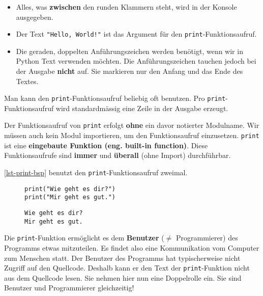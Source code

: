 \begin{itemize}
	\item Alles, was \textbf{zwischen} den runden Klammern steht, wird in der Konsole ausgegeben.
	\item Der Text \lstinline[showstringspaces=False]{"Hello, World!"} ist das Argument für den \lstinline{print}-Funktionsaufruf.
	\item Die geraden, doppelten Anführungszeichen werden benötigt, wenn wir in Python Text verwenden möchten. Die Anführungszeichen tauchen jedoch bei der Ausgabe \textbf{nicht} auf. Sie markieren nur den Anfang und das Ende des Textes.
\end{itemize}

Man kann den \lstinline{print}-Funktionsaufruf beliebig oft benutzen. Pro \lstinline{print}-Funktionsaufruf wird standardmässig eine Zeile in der Ausgabe erzeugt.

\begin{important}
Der Funktionsaufruf von \lstinline{print} erfolgt \textbf{ohne} ein davor notierter Modulname. Wir müssen auch kein Modul importieren, um den Funktionsaufruf einzusetzen. \lstinline{print} ist eine \textbf{eingebaute Funktion (eng. built-in function)}. Diese Funktionsaufrufe sind \textbf{immer} und \textbf{überall} (ohne Import) durchführbar. 
\end{important}

\begin{example}
\autoref{lst-print-bsp} benutzt den \lstinline{print}-Funktionsaufruf zweimal. 

\begin{figure}[htb]
\centering
	\begin{minipage}{0.5\textwidth}
	\centering
\begin{lstlisting}[caption={Quellcode aus \graybgtexttt{print\_bsp.py}.}, label=lst-print-bsp]
print("Wie geht es dir?")
print("Mir geht es gut.")
\end{lstlisting}
	\end{minipage}
	\hfill
	\begin{minipage}{0.4\textwidth}
	\centering
\begin{lstlisting}[caption={Ausgabe in der Konsole.}, language=output]
Wie geht es dir?
Mir geht es gut.
\end{lstlisting}		
	\end{minipage}
\end{figure}
\end{example}

\begin{hinweis}
	Die \lstinline{print}-Funktion ermöglicht es dem \textbf{Benutzer} ($\neq$ Programmierer) des Programms etwas mitzuteilen. Es findet also eine Kommunikation vom Computer zum Menschen statt. Der Benutzer des Programms hat typischerweise nicht Zugriff auf den Quellcode. Deshalb kann er den Text der \lstinline{print}-Funktion nicht aus dem Quellcode lesen. Sie nehmen hier nun eine Doppelrolle ein. Sie sind Benutzer und Programmierer gleichzeitig!
\end{hinweis}

